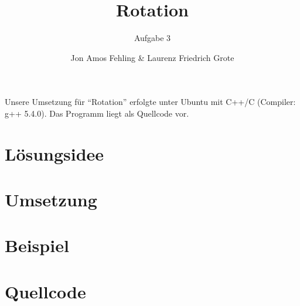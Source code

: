 \documentclass[parskip=full, DIV=14]{scrartcl}
\begin{document}
	\pagestyle{scrheadings}


	\titlehead{Aufgabe 3: Rotation, Team 00001 \hfill Jon Fehling, Laurenz Grote}
	\title{Rotation}
	\subtitle{Aufgabe 3}
	\author{Jon Amos Fehling \& Laurenz Friedrich Grote}
	\date{}
	\maketitle
	\tableofcontents
	
	\vspace {2em}
	Unsere Umsetzung für "`Rotation"' erfolgte unter Ubuntu mit C++/C (Compiler: g++ 5.4.0). Das Programm liegt als Quellcode vor.
	\clearpage
	\section{Lösungsidee}
		
	\clearpage
	\section{Umsetzung}
		
\clearpage
	\section{Beispiel}
		
	\clearpage
	\section{Quellcode}
		
\end{document}
